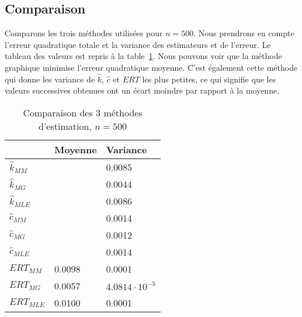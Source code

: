 \subsection{Comparaison}
Comparons les trois méthodes utilisées pour $n = 500$. Nous prendrons en compte l'erreur quadratique totale et la variance des estimateurs et de l'erreur. Le tableau des valeurs est repris à la table~\ref{table:comp}.
Nous pouvons voir que la méthode graphique minimise l'erreur quadratique moyenne. C'est également cette méthode qui donne les variance de $\hat{k}$, $\hat{c}$ et $ERT$ les plus petites, ce qui signifie que les valeurs successives obtenues ont un écart moindre par rapport à la moyenne.

\begin{table}[!h]
\centering
\begin{tabular}{|l|l|l|}
\hline
				& Moyenne	& Variance\\
\hline
$\hat{k}_{MM}$	&			& 0.0085\\
$\hat{k}_{MG}$	&			& 0.0044\\
$\hat{k}_{MLE}$	&			& 0.0086\\
\hline
$\hat{c}_{MM}$	&			& 0.0014\\
$\hat{c}_{MG}$	&			& 0.0012\\
$\hat{c}_{MLE}$	&			& 0.0014\\
\hline
$ERT_{MM}$		& 0.0098	& 0.0001\\
$ERT_{MG}$		& 0.0057	& $4.0814\cdot 10^{-5}$\\
$ERT_{MLE}$		& 0.0100	& 0.0001\\
\hline
\end{tabular}
\caption{Comparaison des 3 méthodes d'estimation, $n = 500$}
\label{table:comp}
\end{table}
